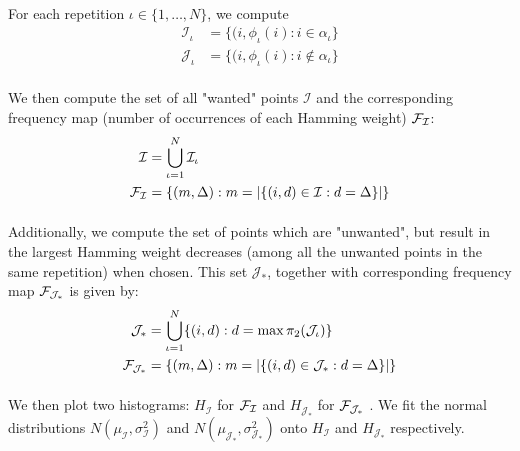 \paragraph{}
For each repetition $\iota \in \{1, \dots, N\}$, we compute
\begin{align*}
    \mathcal{I}_\iota &= \{(i, \phi_\iota(i) : i \in \alpha_\iota\}\\
    \mathcal{J}_\iota &= \{(i, \phi_\iota(i) : i \not\in \alpha_\iota\}
\end{align*}

\paragraph{}
We then compute the set of all "wanted" points $\mathcal{I}$ and the corresponding frequency map (number of occurrences of each Hamming weight) $\mathcal{F}_{\mathcal{I}}$:
\begin{align*}
    \mathcal{I} &= \bigcup_{\iota = 1}^N \mathcal{I}_\iota\\
    \mathcal{F}_{\mathcal{I}} &= \{ (m, \Delta) : m = |\{ (i, d) \in \mathcal{I} : d = \Delta \}| \}
\end{align*}

\paragraph{}
Additionally, we compute the set of points which are "unwanted", but result in the largest Hamming weight decreases (among all the unwanted points in the same repetition) when chosen. This set $\mathcal{J}_*$, together with corresponding frequency map $\mathcal{F}_{\mathcal{J}_*}$ is given by:
\begin{align*}
    \mathcal{J}_* &= \bigcup_{\iota = 1}^N \{ (i, d) : d = \max \pi_2(\mathcal{J}_\iota) \}\\
    \mathcal{F}_{\mathcal{J}_*} &= \{ (m, \Delta) : m = |\{ (i, d) \in \mathcal{J}_* : d = \Delta \}| \}
\end{align*}

\paragraph{}
We then plot two histograms: $H_\mathcal{I}$ for $\mathcal{F}_{\mathcal{I}}$ and $H_{\mathcal{J}_*}$ for $\mathcal{F}_{\mathcal{J}_*}$ . We fit the normal distributions $N(\mu_\mathcal{I}, \sigma_\mathcal{I}^2)$ and $N(\mu_{\mathcal{J}_*}, \sigma_{\mathcal{J}_*}^2)$ onto $H_\mathcal{I}$ and $H_{\mathcal{J}_*}$ respectively.

